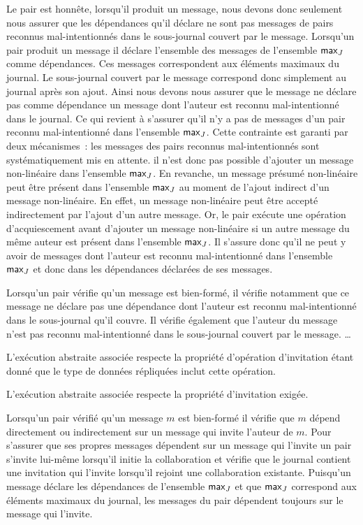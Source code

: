 Le pair est honnête, lorsqu'il produit un message, nous devons donc seulement nous assurer que les dépendances qu'il déclare ne sont pas messages de pairs reconnus mal-intentionnés dans le sous-journal couvert par le message.
Lorsqu'un pair produit un message il déclare l'ensemble des messages de l'ensemble $\operatorname{\mathsf{max}}_J$ comme dépendances.
Ces messages correspondent aux éléments maximaux du journal.
Le sous-journal couvert par le message correspond donc simplement au journal après son ajout.
Ainsi nous devons nous assurer que le message ne déclare pas comme dépendance un message dont l'auteur est reconnu mal-intentionné dans le journal.
Ce qui revient à s'assurer qu'il n'y a pas de messages d'un pair reconnu mal-intentionné dans l'ensemble $\operatorname{\mathsf{max}}_J$.
Cette contrainte est garanti par deux mécanismes~: les messages des pairs reconnus mal-intentionnés sont systématiquement mis en attente.
il n'est donc pas possible d'ajouter un message non-linéaire dans l'ensemble $\operatorname{\mathsf{max}}_J$.
En revanche, un message présumé non-linéaire peut être présent dans l'ensemble $\operatorname{\mathsf{max}}_J$ au moment de l'ajout indirect d'un message non-linéaire.
En effet, un message non-linéaire peut être accepté indirectement par l'ajout d'un autre message.
Or, le pair exécute une opération d'acquiescement avant d'ajouter un message non-linéaire si un autre message du même auteur est présent dans l'ensemble $\operatorname{\mathsf{max}}_J$.
Il s'assure donc qu'il ne peut y avoir de messages dont l'auteur est reconnu mal-intentionné dans l'ensemble $\operatorname{\mathsf{max}}_J$ et donc dans les dépendances déclarées de ses messages.

Lorsqu'un pair vérifie qu'un message est bien-formé, il vérifie notamment que ce message ne déclare pas une dépendance dont l'auteur est reconnu mal-intentionné dans le sous-journal qu'il couvre.
Il vérifie également que l'auteur du message n'est pas reconnu mal-intentionné dans le sous-journal couvert par le message.
\ldots

L'exécution abstraite associée respecte la propriété d'opération d'invitation étant donné que le type de données répliquées inclut cette opération.

L'exécution abstraite associée respecte la propriété d'invitation exigée.

Lorsqu'un pair vérifié qu'un message $m$ est bien-formé il vérifie que $m$ dépend directement ou indirectement sur un message qui invite l'auteur de $m$.
Pour s'assurer que ses propres messages dépendent sur un message qui l'invite un pair s'invite lui-même lorsqu'il initie la collaboration et vérifie que le journal contient une invitation qui l'invite lorsqu'il rejoint une collaboration existante.
Puisqu'un message déclare les dépendances de l'ensemble $\operatorname{\mathsf{max}}_J$ et que $\operatorname{\mathsf{max}}_J$ correspond aux éléments maximaux du journal, les messages du pair dépendent toujours sur le message qui l'invite.

